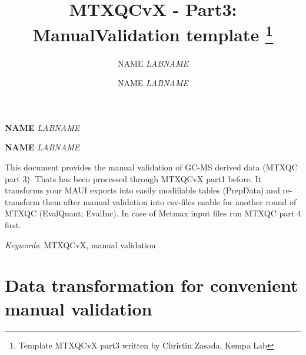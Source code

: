 \documentclass[9pt,]{article}
\title{MTXQCvX - Part3: ManualValidation template \thanks{Template MTXQCvX part3 written by Christin Zasada, Kempa Lab}  }
\author{\Large NAME\vspace{0.05in} \newline\normalsize\emph{LABNAME}   \and \Large NAME\vspace{0.05in} \newline\normalsize\emph{LABNAME}  }
\date{}
\newcommand*{\authorfont}{\fontfamily{phv}\selectfont}
\renewenvironment{abstract}
 {{%
    \setlength{\leftmargin}{0mm}
    \setlength{\rightmargin}{\leftmargin}%
  }%
  \relax}
 {\endlist}
\begin{document}
	
%

{%
\setlength{\parindent}{0pt}
\thispagestyle{plain}
{\fontsize{18}{20}\selectfont\raggedright 
\maketitle  %

}

{
   \vskip 13.5pt\relax \normalsize\fontsize{11}{12} 
\textbf{\authorfont NAME} \hskip 15pt \emph{\small LABNAME}   \par \textbf{\authorfont NAME} \hskip 15pt \emph{\small LABNAME}   

}

}



{
\hypersetup{linkcolor=black}
\setcounter{tocdepth}{2}
\tableofcontents
}




\begin{abstract}

    \hbox{\vrule height .2pt width 39.14pc}

    \vskip 8.5pt %

\noindent This document provides the manual validation of GC-MS derived data
(MTXQC part 3). Thats has been processed through MTXQCvX part1 before.
It transforms your MAUI exports into easily modifiable tables (PrepData)
and re-transform them after manual validation into csv-files usable for
another round of MTXQC (EvalQuant; EvalInc). In case of Metmax input
files run MTXQC part 4 first.


\vskip 8.5pt \noindent \emph{Keywords}: MTXQCvX, manual validation \par

    \hbox{\vrule height .2pt width 39.14pc}



\end{abstract}


\vskip 6.5pt

\noindent  \section{Data transformation for convenient manual
validation}\label{data-transformation-for-convenient-manual-validation}
\end{document}
